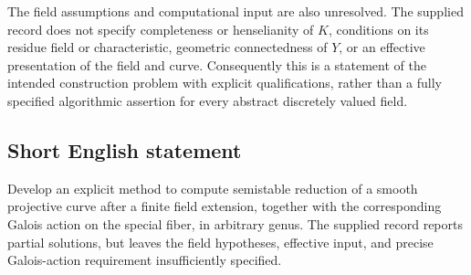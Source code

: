 \documentclass[11pt]{article}
\begin{document}
The field assumptions and computational input are also unresolved. The supplied record does not specify completeness or henselianity of \(K\), conditions on its residue field or characteristic, geometric connectedness of \(Y\), or an effective presentation of the field and curve. Consequently this is a statement of the intended construction problem with explicit qualifications, rather than a fully specified algorithmic assertion for every abstract discretely valued field.
\subsection{Short English statement}
Develop an explicit method to compute semistable reduction of a smooth projective curve after a finite field extension, together with the corresponding Galois action on the special fiber, in arbitrary genus. The supplied record reports partial solutions, but leaves the field hypotheses, effective input, and precise Galois-action requirement insufficiently specified.
\end{document}
